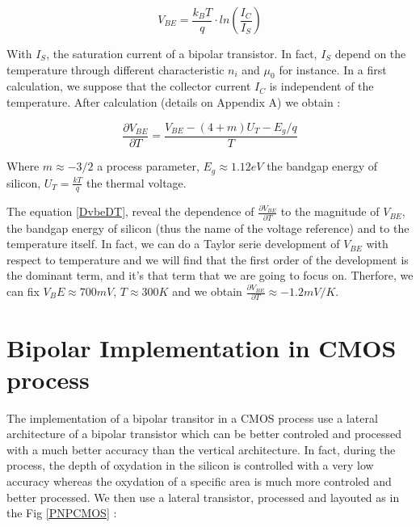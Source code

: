 \documentclass[11pt,a4paper]{report}
\begin{document}
\begin{equation}
  V_{BE} = \frac{k_BT}{q} \cdot ln \left( \frac{I_C}{I_S} \right)
\end{equation}

With $I_S$, the saturation current of a bipolar transistor. In fact, $I_S$ depend on the temperature through different characteristic $n_i$ and $\mu_0$ for instance. In a first calculation, we suppose that the collector current $I_C$ is independent of the temperature. After calculation (details on Appendix A) we obtain : 

\begin{equation}
 \frac{\partial V_{BE}}{\partial T} = \frac{V_{BE} - (4+m)U_T - E_g/q}{T}
 \label{DvbeDT}                        
\end{equation}

Where $m \approx -3/2$ a process parameter, $E_g \approx 1.12 eV $ the bandgap energy of silicon, $U_T = \frac{kT}{q}$ the thermal voltage. 

The equation \ref{DvbeDT}, reveal the dependence of $\frac{\partial V_{BE}}{\partial T}$ to the magnitude of $V_{BE}$, the bandgap energy of silicon (thus the name of the voltage reference) and to the temperature itself. In fact, we can do a Taylor serie development of $V_{BE}$ with respect to temperature and we will find that the first order of the development is the dominant term, and it's that term that we are going to focus on.
Therfore, we can fix $V_BE \approx 700 mV $, $T \approx 300 K$ and we obtain $\frac{\partial V_{BE}}{\partial T} \approx -1.2 mV/ K$.


\newpage

\section{Bipolar Implementation in CMOS process}

The implementation of a bipolar transitor in a CMOS process use a lateral architecture of a bipolar transistor which can be better controled and processed with a much better accuracy than the vertical architecture. In fact, during the process, the depth of oxydation in the silicon is controlled with a very low accuracy whereas the oxydation of a specific area is much more controled and better processed. We then use a lateral transistor, processed and layouted as in the Fig \ref{PNPCMOS} : 
\end{document}
